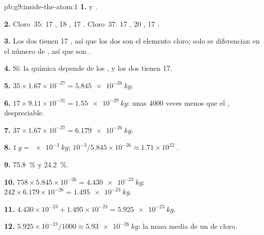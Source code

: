 \begin{solution}{pb:g9:inside-the-atom:1}
\textbf{1.}  y .

\textbf{2.} Cloro~35: 17 , 18 , 17 .
Cloro~37: 17 , 20 , 17 .

\textbf{3.} Los dos tienen 17 , así que los dos son el elemento
cloro; solo se diferencian en el número de , así que son
.

\textbf{4.} Sí: la química depende de los , y los dos tienen
17.

\textbf{5.} $35 \times 1.67 \times 10^{-27} = \qty{5.845e-26}{kg}$.

\textbf{6.} $17 \times 9.11 \times 10^{-31} = \qty{1.55e-29}{kg}$:
unas 4000 veces menos que el , despreciable.

\textbf{7.} $37 \times 1.67 \times 10^{-27} = \qty{6.179e-26}{kg}$.

\textbf{8.} $\qty{1}{g} = \qty{e-3}{kg}$; $10^{-3} / 5.845 \times
10^{-26} \approx 1.71 \times 10^{22}$ .

\textbf{9.} \qty{75.8}{\percent} y \qty{24.2}{\percent}.

\textbf{10.} $758 \times 5.845 \times 10^{-26} = \qty{4.430e-23}{kg}$;
$242 \times 6.179 \times 10^{-26} = \qty{1.495e-23}{kg}$.

\textbf{11.} $4.430 \times 10^{-23} + 1.495 \times 10^{-23} =
\qty{5.925e-23}{kg}$.

\textbf{12.} $5.925 \times 10^{-23} / 1000 \approx
\qty{5.93e-26}{kg}$: la masa media de un  de cloro.
\end{solution}
